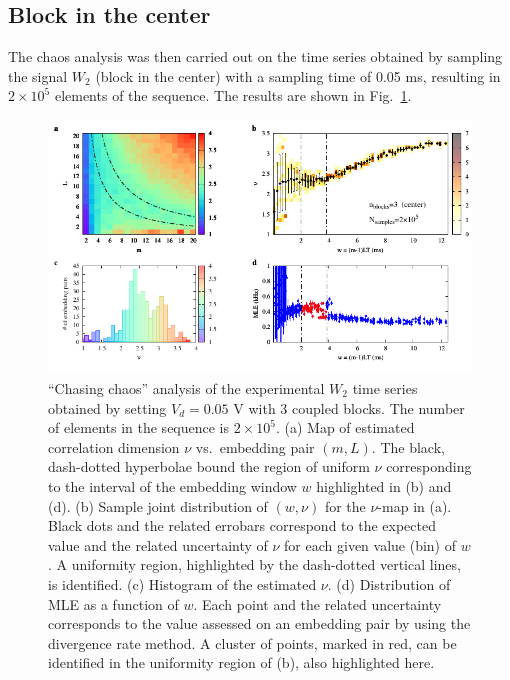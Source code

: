 \subsection{Block in the center}\label{subsec: 3 blocks chaos center}

The chaos analysis was then carried out on the time series obtained by sampling the signal $W_2$
(block in the center) with a sampling time of 0.05 ms, resulting in $2\times10^5$ elements of the
sequence. The results are shown in Fig.~\ref{fig:3 blocks chaos center 2e5}.

\begin{figure}[ht!]
    \centering
    \includegraphics[width=\linewidth]{../blocks/3_blocks/middle/2e5_points/plots/chaos_low.pdf}
    \caption{``Chasing chaos'' analysis of the experimental $W_2$ time series obtained by setting $V_d=0.05$ V with 3 coupled blocks.
    The number of elements in the sequence is $2\times10^5$.
    (a) Map of estimated correlation dimension $\nu$ vs.\ embedding pair $(m, L)$.
    The black, dash-dotted hyperbolae bound the region of uniform $\nu$ corresponding to the interval of the
    embedding window $w$ highlighted in (b) and (d).
    (b) Sample joint distribution of $(w,\nu)$ for the $\nu$-map in (a).
    Black dots and the related errobars correspond to the expected value and the related uncertainty of $\nu$
    for each given value (bin) of $w$. A uniformity region, highlighted by the dash-dotted vertical lines,
    is identified. (c) Histogram of the estimated $\nu$. (d) Distribution of MLE as a function of $w$. Each point and the related
    uncertainty corresponds to the value assessed on an embedding pair by using the divergence rate method.
    A cluster of points, marked in red, can be identified in the uniformity region of (b), also highlighted here.
    }\label{fig:3 blocks chaos center 2e5}
\end{figure}

